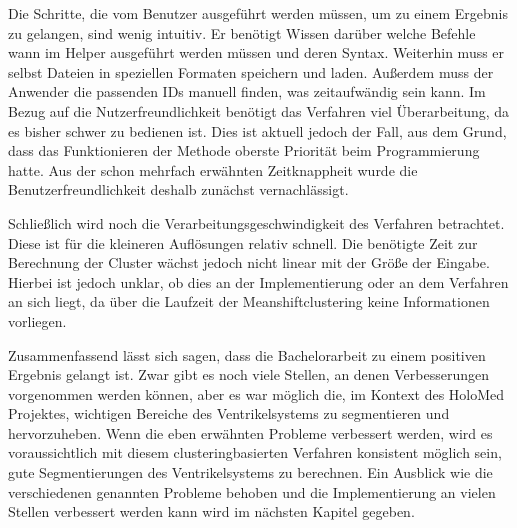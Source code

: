 Die Schritte, die vom Benutzer ausgeführt werden müssen, um zu einem Ergebnis zu gelangen, sind wenig intuitiv. Er benötigt Wissen darüber welche Befehle wann im Helper ausgeführt werden müssen und deren Syntax.
\newline
Weiterhin muss er selbst Dateien in speziellen Formaten speichern und laden. Außerdem muss der Anwender die passenden IDs manuell finden, was zeitaufwändig sein kann.
\newline
Im Bezug auf die Nutzerfreundlichkeit benötigt das Verfahren viel Überarbeitung, da es bisher schwer zu bedienen ist.
\newline
Dies ist aktuell jedoch der Fall, aus dem Grund, dass das Funktionieren der Methode oberste Priorität beim Programmierung hatte. Aus der schon mehrfach erwähnten Zeitknappheit wurde die Benutzerfreundlichkeit deshalb zunächst vernachlässigt.


Schließlich wird noch die Verarbeitungsgeschwindigkeit des Verfahren betrachtet.
\newline
Diese ist für die kleineren Auflösungen relativ schnell. Die benötigte Zeit zur Berechnung der Cluster wächst jedoch nicht linear mit der Größe der Eingabe.
\newline
Hierbei ist jedoch unklar, ob dies an der Implementierung oder an dem Verfahren an sich liegt, da über die Laufzeit der Meanshiftclustering keine Informationen vorliegen.


Zusammenfassend lässt sich sagen, dass die Bachelorarbeit zu einem positiven Ergebnis gelangt ist. Zwar gibt es noch viele Stellen, an denen Verbesserungen vorgenommen werden können, aber es war möglich die, im Kontext des HoloMed Projektes, wichtigen Bereiche des Ventrikelsystems zu segmentieren und hervorzuheben.
\newline
Wenn die eben erwähnten Probleme verbessert werden, wird es voraussichtlich mit diesem clusteringbasierten Verfahren konsistent möglich sein, gute Segmentierungen des Ventrikelsystems zu berechnen.
\newline
Ein Ausblick wie die verschiedenen genannten Probleme behoben und die Implementierung an vielen Stellen verbessert werden kann wird im nächsten Kapitel gegeben.

























